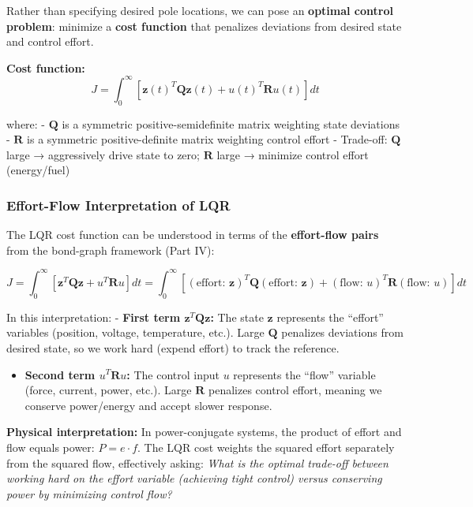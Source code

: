 \documentclass[
]{article}
\providecommand{\tightlist}{%
  \setlength{\itemsep}{0pt}\setlength{\parskip}{0pt}}
\begin{document}
Rather than specifying desired pole locations, we can pose an
\textbf{optimal control problem}: minimize a \textbf{cost function} that
penalizes deviations from desired state and control effort.

\textbf{Cost function:}
\[J = \int_0^\infty \left[\mathbf{z}(t)^T \mathbf{Q}\mathbf{z}(t) + u(t)^T \mathbf{R}u(t)\right]dt\]

where: - \(\mathbf{Q}\) is a symmetric positive-semidefinite matrix
weighting state deviations - \(\mathbf{R}\) is a symmetric
positive-definite matrix weighting control effort - Trade-off:
\(\mathbf{Q}\) large → aggressively drive state to zero; \(\mathbf{R}\)
large → minimize control effort (energy/fuel)

\subsubsection{Effort-Flow Interpretation of
LQR}\label{effort-flow-interpretation-of-lqr}

The LQR cost function can be understood in terms of the
\textbf{effort-flow pairs} from the bond-graph framework (Part IV):

\[J = \int_0^\infty \left[\mathbf{z}^T \mathbf{Q}\mathbf{z} + u^T \mathbf{R}u\right]dt = \int_0^\infty \left[(\text{effort: } \mathbf{z})^T \mathbf{Q} (\text{effort: } \mathbf{z}) + (\text{flow: } u)^T \mathbf{R}(\text{flow: } u)\right]dt\]

In this interpretation: - \textbf{First term
\(\mathbf{z}^T \mathbf{Q}\mathbf{z}\):} The state \(\mathbf{z}\)
represents the ``effort'' variables (position, voltage, temperature,
etc.). Large \(\mathbf{Q}\) penalizes deviations from desired state, so
we work hard (expend effort) to track the reference.

\begin{itemize}
\tightlist
\item
  \textbf{Second term \(u^T \mathbf{R}u\):} The control input \(u\)
  represents the ``flow'' variable (force, current, power, etc.). Large
  \(\mathbf{R}\) penalizes control effort, meaning we conserve
  power/energy and accept slower response.
\end{itemize}

\textbf{Physical interpretation:} In power-conjugate systems, the
product of effort and flow equals power: \(P = e \cdot f\). The LQR cost
weights the squared effort separately from the squared flow, effectively
asking: \emph{What is the optimal trade-off between working hard on the
effort variable (achieving tight control) versus conserving power by
minimizing control flow?}
\end{document}
